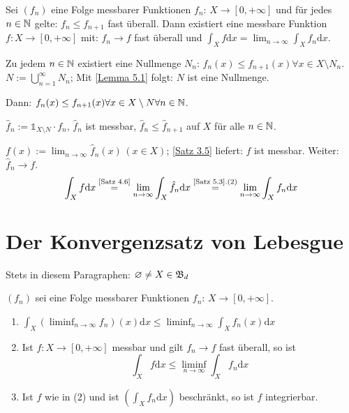 \documentclass[a4paper,twoside,DIV15,BCOR12mm,chapterprefix=true,headings=onelinechapter]{scrbook}
\begin{document}
\begin{satz}
\label{Satz 5.5}
Sei \((f_{n})\) eine Folge messbarer Funktionen \(f_{n}:\,X\to[0,+\infty]\) und für jedes \(n\in\mathbb{N}\) gelte:
\(f_{n}\leq f_{n+1}\) fast überall.  Dann existiert eine messbare Funktion
\(f:X\to[0,+\infty]\) mit: \(f_{n}\to f\) fast \"uberall und \(\int_{X}{f\mathrm{d}x}=\lim_{n\to\infty}{\int_{X}{f_{n}\mathrm{d}x}}\).
\end{satz}

\begin{beweis}
Zu jedem \(n\in\mathbb{N}\) existiert eine Nullmenge 
\(N_{n}:\,f_{n}(x)\leq f_{n+1}(x)\forall x\in X\setminus N_{n}\). 
\(N:=\bigcup_{n=1}^{\infty}{N_{n}}\); Mit \ref{Lemma 5.1} folgt: \(N\) ist eine
Nullmenge.

Dann: \(f_{n}(x)\leq f_{n+1}(x)\forall x\in X\setminus N\forall n\in\mathbb{N}\).

\(\hat{f}_{n}:=\mathds{1}_{X\setminus N}\cdot f_{n}\), \(\hat{f}_{n}\) ist 
messbar, \(\hat{f}_{n}\leq\hat{f}_{n+1}\) auf \(X\) f\"ur alle \(n\in\mathbb{N}\).

\(f(x):=\lim_{n\to\infty}{\hat{f}_{n}(x)}\,(x\in X)\); \ref{Satz 3.5} liefert:
\(f\) ist messbar. Weiter: \(\hat{f}_{n}\to f\).
\[
\int_{X}{f\mathrm{d}x}\overset{\text{\ref{Satz 4.6}}}{=}\lim_{n\to\infty}{\int_{X}{\hat{f}_{n}\mathrm{d}x}}\overset{\text{\ref{Satz 5.3}.(2)}}{=}\lim_{n\to\infty}{\int_{X}{f_{n}\mathrm{d}x}}
\]
\end{beweis}

\chapter{Der Konvergenzsatz von Lebesgue}
Stets in diesem Paragraphen: \(\varnothing\neq X\in\mathfrak{B}_{d}\)

\begin{lemma}
\label{Lemma 6.1}
\((f_{n})\) sei eine Folge messbarer Funktionen \(f_{n}:\,X\to[0,+\infty]\).
\begin{enumerate}
\item \(\int_{X}{(\liminf_{n\to\infty}f_{n})(x)\mathrm{d}x}\leq\liminf_{n\to\infty}{\int_{X}{f_{n}(x)\mathrm{d}x}}\)
\item Ist \(f: X\to[0,+\infty]\) messbar und gilt \(f_{n}\to f\) fast \"uberall,
so ist
\[
\int_{X}{f\mathrm{d}x}\leq\liminf_{n\to\infty}{\int_{X}{f_{n}\mathrm{d}x}}
\]
\item Ist \(f\) wie in (2) und ist \(\left(\int_{X}{f_{n}\mathrm{d}x}\right)\)
beschr\"ankt, so ist \(f\) integrierbar.
\end{enumerate}
\end{lemma}
\end{document}
